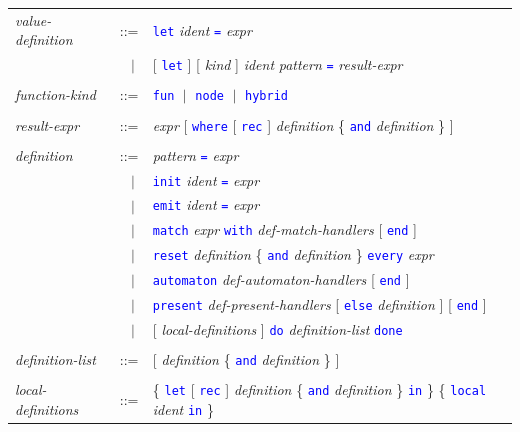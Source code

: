 \documentclass[11pt,titlepage,twoside]{report}
\newcommand{\alt}{\;|\;}
\newcommand{\Let}{\mbox{{\tt let}}}
\newcommand{\Rec}{\mbox{{\tt rec}}}
\newcommand{\In}{\mbox{{\tt in}}}
\newcommand{\And}{\mbox{{\tt and}}}
\renewcommand{\Reset}{\mbox{{\tt reset}}}
\newcommand{\Every}{\mbox{{\tt every}}}
\newcommand{\Where}{\mbox{{\tt where}}}
\newcommand{\term}[1]{\textcolor{Blue}{\tt #1}}
\newcommand{\nterm}[1]{\textcolor{BrickRed}{\it #1}}
\newcommand{\term}[1]{{\tt #1}}
\newcommand{\nterm}[1]{{\em #1}}
\begin{document}
\label{definitions}
\begin{center}
\begin{tabular}{lcl}
\nterm{value-definition}
   & ::=        & \term{let} \nterm{ident} \term{=} \nterm{expr} \\
   & $\;\;\alt$ & [ \term{let} ] [ \nterm{kind} ] \nterm{ident} \nterm{pattern} \term{=}
                    \nterm{result-expr}
\\ \\
\nterm{function-kind} & ::=  & \term{fun} $\alt$ \term{node}
                                              $\alt$ \term{hybrid}
\\ \\
\nterm{result-expr}
& ::=    & \nterm{expr} [ \term{\Where} [ \term{\Rec} ]
  \nterm{definition} \{ \term{\And} \nterm{definition} \} ]
\\ \\
\nterm{definition} 
& ::=        & \nterm{pattern} \term{=} \nterm{expr} \\
   & $\;\;\alt$ & \term{init} \nterm{ident} \term{=} \nterm{expr} \\
   & $\;\;\alt$ & \term{emit} \nterm{ident} \term{=} \nterm{expr} \\
& $\;\;\alt$ & \term{match} \nterm{expr} \term{with}  
\nterm{def-match-handlers} [ \term{end} ]
\\
& $\;\;\alt$ & \term{\Reset} \nterm{definition}
               \{ \term{\And} \nterm{definition} \} \term{\Every} \nterm{expr}
                  \\
& $\;\;\alt$ & \term{automaton} \nterm{def-automaton-handlers}
                  [ \term{end} ]
                  \\
& $\;\;\alt$ & \term{present} \nterm{def-present-handlers}
                    [ \term{else} \nterm{definition} ] [ \term{end} ]
                  \\
& $\;\;\alt$ & [ \nterm{local-definitions} ]
                    \term{do} \nterm{definition-list} \term{done}
\\ \\
\nterm{definition-list}
   & ::=        & [ \nterm{definition} \{ \term{\And}
                  \nterm{definition} \} ]
\\ \\
\nterm{local-definitions}      
   & ::=        & \{ \term{\Let} [ \term{\Rec} ] \nterm{definition}
                  \{ \term{\And} \nterm{definition} \} \term{\In} \}
                  \{ \term{local} \nterm{ident} \term{in} \}
\end{tabular}
\end{center}
\end{document}
